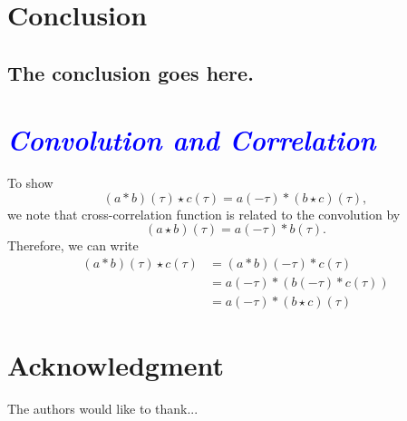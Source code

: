 \documentclass[conference,onecolumn]{IEEEtran}
\newcommand{\parham}[1]{\textsf{\emph{\textbf{\textcolor{blue}{#1}}}}}
\begin{document}
\section{Conclusion}
\subsection{The conclusion goes here.}




\appendix
\section*{\parham{Convolution and Correlation}}
To show 
\begin{equation}
 \left(a \ast b \right)\left(\tau\right)  \star c\left(\tau\right)  = a\left(-\tau\right)\ast\left(b \star c\right)\left(\tau\right),
\end{equation}
we note that cross-correlation function is related to the convolution by \cite{Yarlagadda2009}
\begin{equation}
 \left(a \star b\right)\left(\tau\right)= a\left(-\tau \right)\ast b\left(\tau\right).
\end{equation}
Therefore, we can write
\begin{align}
 \left(a \ast b\right)\left(\tau\right) \star c\left(\tau\right)&= \left(a \ast b\right)\left(-\tau \right)\ast c\left(\tau\right) \nonumber \\
&=a\left(-\tau\right)\ast \left(b\left(-\tau\right) \ast c\left(\tau\right)\right)\nonumber \\
&=a\left(-\tau\right)\ast\left(b\star c\right)\left(\tau\right)
\end{align}



\section*{Acknowledgment}


The authors would like to thank...









\end{document}
